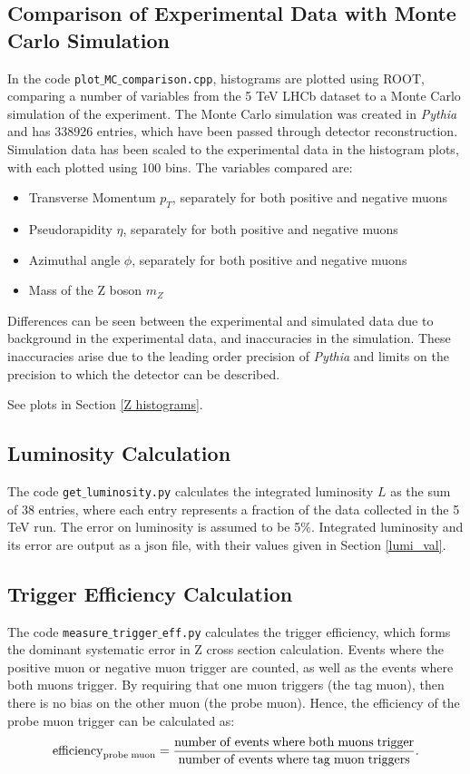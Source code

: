 \documentclass[a4paper]{article}
\begin{document}
\subsection{Comparison of Experimental Data with Monte Carlo Simulation} \label{sec: Z MC comparison}
In the code \texttt{plot$\_$MC$\_$comparison.cpp}, histograms are plotted using ROOT, comparing a number of variables from the 5 TeV LHCb dataset to a Monte Carlo simulation of the experiment. The Monte Carlo simulation was created in \textit{Pythia} and has 338926 entries, which have been passed through detector reconstruction. Simulation data has been scaled to the experimental data in the histogram plots, with each plotted using 100 bins.
The variables compared are:
\begin{itemize}
  \item Transverse Momentum $p_T$, separately for both positive and negative muons
  \item Pseudorapidity $\eta$, separately for both positive and negative muons
  \item Azimuthal angle $\phi$, separately for both positive and negative muons
  \item Mass of the Z boson $m_Z$
\end{itemize}

Differences can be seen between the experimental and simulated data due to background in the experimental data, and inaccuracies in the simulation. These inaccuracies arise due to the leading order precision of \textit{Pythia} and limits on the precision to which the detector can be described.

See plots in Section \ref{Z histograms}.

\subsection{Luminosity Calculation} \label{sec: Z lumi}
The code \texttt{get$\_$luminosity.py} calculates the integrated luminosity $L$ as the sum of 38 entries, where each entry represents a fraction of the data collected in the 5 TeV run.
The error on luminosity is assumed to be 5$\%$.
Integrated luminosity and its error are output as a json file, with their values given in Section \ref{lumi_val}.
 
\subsection{Trigger Efficiency Calculation} \label{sec: Z trigger efficiency}
The code \texttt{measure$\_$trigger$\_$eff.py} calculates the trigger efficiency, which forms the dominant systematic error in Z cross section calculation. 
Events where the positive muon or negative muon trigger are counted, as well as the events where both muons trigger. 
By requiring that one muon triggers (the tag muon), then there is no bias on the other muon (the probe muon). Hence, the efficiency of the probe muon trigger can be calculated as:
\begin{equation}
{\rm efficiency}_{{\rm probe \;  muon}} = \frac{{\rm number \; of \; events \; where \; both \; muons \; trigger}}{{\rm number \; of \; events \; where \; tag \; muon \; triggers}}.
\end{equation}
\end{document}
